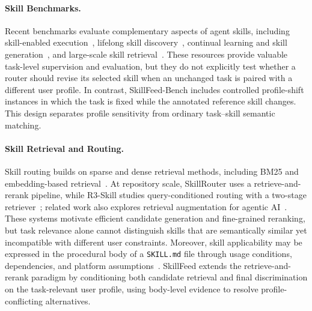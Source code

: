\documentclass[letterpaper]{article} %
\begin{document}
\paragraph{Skill Benchmarks.}
Recent benchmarks evaluate complementary aspects of agent skills, including skill-enabled execution~\citep{li2026skillsbenchbenchmarkingagentskills,han2026sweskillsbenchagentskillsactually}, lifelong skill discovery~\citep{zhang2026skillflowbench}, continual learning and skill generation~\citep{zhong2026skilllearnbench,zhou2026skillgenbench}, and large-scale skill retrieval~\citep{cho2026skillretlargescalebenchmarkskill,wang2026r3skill}. These resources provide valuable task-level supervision and evaluation, but they do not explicitly test whether a router should revise its selected skill when an unchanged task is paired with a different user profile. In contrast, SkillFeed-Bench includes controlled profile-shift instances in which the task is fixed while the annotated reference skill changes. This design separates profile sensitivity from ordinary task--skill semantic matching.

\paragraph{Skill Retrieval and Routing.}
Skill routing builds on sparse and dense retrieval methods, including BM25 and embedding-based retrieval~\citep{robertson2009bm25,wang2022e5,chen2024bge}. At repository scale, SkillRouter uses a retrieve-and-rerank pipeline, while R3-Skill studies query-conditioned routing with a two-stage retriever~\citep{zheng2026skillrouter,wang2026r3skill}; related work also explores retrieval augmentation for agentic AI~\citep{su2026skillretrievalaugmentationagentic}. These systems motivate efficient candidate generation and fine-grained reranking, but task relevance alone cannot distinguish skills that are semantically similar yet incompatible with different user constraints. Moreover, skill applicability may be expressed in the procedural body of a \texttt{SKILL.md} file through usage conditions, dependencies, and platform assumptions~\citep{openai2026skills,zheng2026skillrouter}. SkillFeed extends the retrieve-and-rerank paradigm by conditioning both candidate retrieval and final discrimination on the task-relevant user profile, using body-level evidence to resolve profile-conflicting alternatives.
\end{document}
